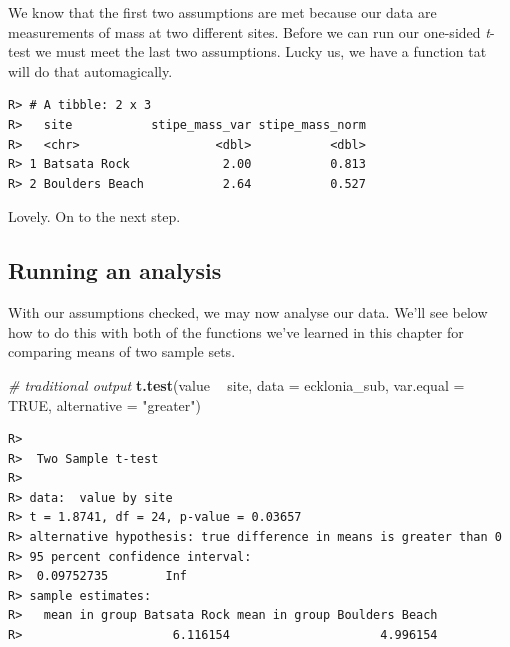 \documentclass[english,10pt,a4paper,oneside]{book}
\newenvironment{Shaded}{\begin{snugshade}}{\end{snugshade}}
\newcommand{\CommentTok}[1]{\textcolor[rgb]{0.56,0.35,0.01}{\textit{#1}}}
\newcommand{\DataTypeTok}[1]{\textcolor[rgb]{0.13,0.29,0.53}{#1}}
\newcommand{\DecValTok}[1]{\textcolor[rgb]{0.00,0.00,0.81}{#1}}
\newcommand{\KeywordTok}[1]{\textcolor[rgb]{0.13,0.29,0.53}{\textbf{#1}}}
\newcommand{\NormalTok}[1]{#1}
\newcommand{\OperatorTok}[1]{\textcolor[rgb]{0.81,0.36,0.00}{\textbf{#1}}}
\newcommand{\OtherTok}[1]{\textcolor[rgb]{0.56,0.35,0.01}{#1}}
\newcommand{\StringTok}[1]{\textcolor[rgb]{0.31,0.60,0.02}{#1}}
\theoremstyle{definition}
\theoremstyle{definition}
\theoremstyle{definition}
\theoremstyle{remark}
\begin{document}
We know that the first two assumptions are met because our data are
measurements of mass at two different sites. Before we can run our
one-sided \emph{t}-test we must meet the last two assumptions. Lucky us,
we have a function tat will do that automagically.

\begin{Shaded}
\end{Shaded}

\begin{verbatim}
R> # A tibble: 2 x 3
R>   site           stipe_mass_var stipe_mass_norm
R>   <chr>                   <dbl>           <dbl>
R> 1 Batsata Rock             2.00           0.813
R> 2 Boulders Beach           2.64           0.527
\end{verbatim}

Lovely. On to the next step.

\hypertarget{running-an-analysis}{%
\subsection{Running an analysis}\label{running-an-analysis}}

With our assumptions checked, we may now analyse our data. We'll see
below how to do this with both of the functions we've learned in this
chapter for comparing means of two sample sets.

\begin{Shaded}
\begin{Highlighting}[]
\CommentTok{# traditional output}
\KeywordTok{t.test}\NormalTok{(value }\OperatorTok{~}\StringTok{ }\NormalTok{site, }\DataTypeTok{data =}\NormalTok{ ecklonia_sub, }\DataTypeTok{var.equal =} \OtherTok{TRUE}\NormalTok{, }\DataTypeTok{alternative =} \StringTok{"greater"}\NormalTok{)}
\end{Highlighting}
\end{Shaded}

\begin{verbatim}
R> 
R>  Two Sample t-test
R> 
R> data:  value by site
R> t = 1.8741, df = 24, p-value = 0.03657
R> alternative hypothesis: true difference in means is greater than 0
R> 95 percent confidence interval:
R>  0.09752735        Inf
R> sample estimates:
R>   mean in group Batsata Rock mean in group Boulders Beach 
R>                     6.116154                     4.996154
\end{verbatim}
\end{document}
